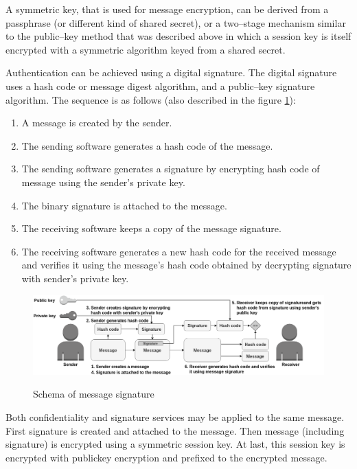 A symmetric key, that is used for message encryption, can be derived from a passphrase (or different kind of shared secret), or a two--stage mechanism similar to the public--key method that was described above in which a session key is itself encrypted with a symmetric algorithm keyed from a shared secret.

Authentication can be achieved using a digital signature. The digital signature uses a hash code or message digest algorithm, and a public--key signature algorithm. The sequence is as follows (also described in the figure \ref{img:messageSignature}):
\begin{enumerate}
    \item A message is created by the sender.
    \item The sending software generates a hash code of the message.
    \item The sending software generates a signature by encrypting hash code of message using the sender's private key.
    \item The binary signature is attached to the message.
    \item The receiving software keeps a copy of the message signature.
    \item The receiving software generates a new hash code for the received message and verifies it using the message's hash code obtained by decrypting signature with sender's private key.
\end{enumerate}

\begin{figure}[H]
    \begin{center}
        \label{img:messageSignature}
        \includegraphics[width=1.0\textwidth]{obrazky-figures/messageSignature.png}
        \caption{Schema of message signature}
    \end{center}
\end{figure}

Both confidentiality and signature services may be applied to the same message. First signature is created and attached to the message. Then message (including signature) is encrypted using a symmetric session key. At last, this session key is encrypted with publickey encryption and prefixed to the encrypted message.

